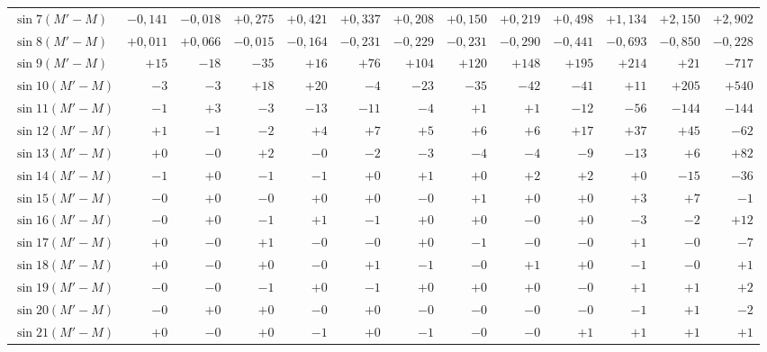\begin{landscape}
\begin{longtable}{@{}l|r|r|r|r|r|r|r|r|r|r|r|r@{}}
\(\sin 7(M'-M)\) & \(-0{,}141\) & \(-0{,}018\) & \(+0{,}275\) & \(+0{,}421\) & \(+0{,}337\) & \(+0{,}208\) & \(+0{,}150\) & \(+0{,}219\) & \(+0{,}498\) & \(+1{,}134\) & \(+2{,}150\) & \(+2{,}902\)\\
\(\sin 8(M'-M)\) & \(+0{,}011\) & \(+0{,}066\) & \(-0{,}015\) & \(-0{,}164\) & \(-0{,}231\) & \(-0{,}229\) & \(-0{,}231\) & \(-0{,}290\) & \(-0{,}441\) & \(-0{,}693\) & \(-0{,}850\) & \(-0{,}228\)\\
\(\sin 9(M'-M)\) & \(+15\) & \(-18\) & \(-35\) & \(+16\) & \(+76\) & \(+104\) & \(+120\) & \(+148\) & \(+195\) & \(+214\) & \(+21\) & \(-717\)\\
\(\sin 10(M'-M)\) & \(-3\) & \(-3\) & \(+18\) & \(+20\) & \(-4\) & \(-23\) & \(-35\) & \(-42\) & \(-41\) & \(+11\) & \(+205\) & \(+540\)\\
\(\sin 11(M'-M)\) & \(-1\) & \(+3\) & \(-3\) & \(-13\) & \(-11\) & \(-4\) & \(+1\) & \(+1\) & \(-12\) & \(-56\) & \(-144\) & \(-144\)\\
\(\sin 12(M'-M)\) & \(+1\) & \(-1\) & \(-2\) & \(+4\) & \(+7\) & \(+5\) & \(+6\) & \(+6\) & \(+17\) & \(+37\) & \(+45\) & \(-62\)\\
\(\sin 13(M'-M)\) & \(+0\) & \(-0\) & \(+2\) & \(-0\) & \(-2\) & \(-3\) & \(-4\) & \(-4\) & \(-9\) & \(-13\) & \(+6\) & \(+82\)\\
\(\sin 14(M'-M)\) & \(-1\) & \(+0\) & \(-1\) & \(-1\) & \(+0\) & \(+1\) & \(+0\) & \(+2\) & \(+2\) & \(+0\) & \(-15\) & \(-36\)\\
\(\sin 15(M'-M)\) & \(-0\) & \(+0\) & \(-0\) & \(+0\) & \(+0\) & \(-0\) & \(+1\) & \(+0\) & \(+0\) & \(+3\) & \(+7\) & \(-1\)\\
\(\sin 16(M'-M)\) & \(-0\) & \(+0\) & \(-1\) & \(+1\) & \(-1\) & \(+0\) & \(+0\) & \(-0\) & \(+0\) & \(-3\) & \(-2\) & \(+12\)\\
\(\sin 17(M'-M)\) & \(+0\) & \(-0\) & \(+1\) & \(-0\) & \(-0\) & \(+0\) & \(-1\) & \(-0\) & \(-0\) & \(+1\) & \(-0\) & \(-7\)\\
\(\sin 18(M'-M)\) & \(+0\) & \(-0\) & \(+0\) & \(-0\) & \(+1\) & \(-1\) & \(-0\) & \(+1\) & \(+0\) & \(-1\) & \(-0\) & \(+1\)\\
\(\sin 19(M'-M)\) & \(-0\) & \(-0\) & \(-1\) & \(+0\) & \(-1\) & \(+0\) & \(+0\) & \(+0\) & \(-0\) & \(+1\) & \(+1\) & \(+2\)\\
\(\sin 20(M'-M)\) & \(-0\) & \(+0\) & \(+0\) & \(-0\) & \(+0\) & \(-0\) & \(-0\) & \(-0\) & \(-0\) & \(-1\) & \(+1\) & \(-2\)\\
\(\sin 21(M'-M)\) & \(+0\) & \(-0\) & \(+0\) & \(-1\) & \(+0\) & \(-1\) & \(-0\) & \(-0\) & \(+1\) & \(+1\) & \(+1\) & \(+1\)\\

\end{longtable}
\end{landscape}
